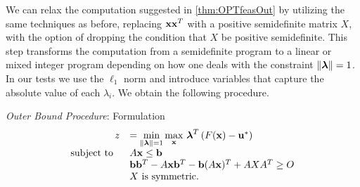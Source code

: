 \bigskip
We can relax the computation suggested in \cref{thm:OPTfeasOut} by utilizing the same techniques as before, replacing $\mathbf{x}\mathbf{x}^T$ with a positive semidefinite matrix $X$, with the option of dropping the condition that $X$ be positive semidefinite.
This step transforms the computation from a semidefinite program to a linear or mixed integer program depending on how one deals with the constraint $\lVert\boldsymbol{\lambda}\rVert=1$. 
In our tests we use the $\ell_1$ norm and introduce variables that capture the absolute value of each $\lambda_i$.
We obtain the following procedure.

\bigskip
\bigskip
\textit{Outer Bound Procedure}: Formulation
\begin{equation}\label{eq:OPTfeasOutRelaxa}
\begin{array}{rl}
 \ z &=\min\limits_{\lVert\boldsymbol{\lambda}\rVert=1}\max\limits_{\mathbf{x}} \, \boldsymbol{\lambda}^T\left(F(\mathbf{x})-\mathbf{u}^* \right) \\
 \text{subject to } \ & A\mathbf{x}\leq \mathbf{b} \\
 	&\mathbf{b}\mathbf{b}^T-A\mathbf{x}\mathbf{b}^T-\mathbf{b}(A\mathbf{x})^T+AXA^T\geq O \\
 	&X \text{ is symmetric.}
\end{array}
\end{equation}

\bigskip




